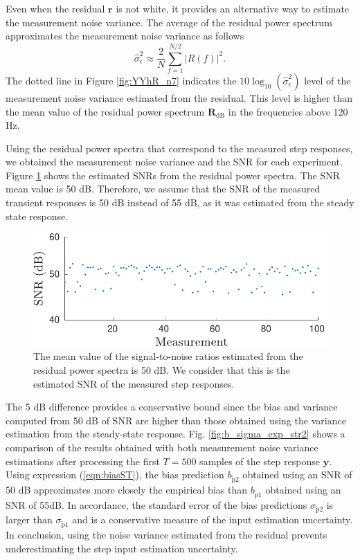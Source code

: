 Even when the residual $\mathbf{r}$ is not white, it provides an alternative way to estimate the measurement noise variance. 
The average of the residual power spectrum approximates the measurement noise variance as follows
\begin{equation} \widehat{\sigma}_\epsilon^2 \approx \dfrac{2}{N} \sum_{f = 1}^{N/2} \left| R \left( f \right) \right|^2 . \label{eqn:P_R} \end{equation}
The dotted line in Figure \ref{fig:YYhR_n7} indicates the $10 \log_{10} \left( \widehat{\sigma}_\epsilon^2 \right)$ level of the measurement noise variance estimated from the residual.
This level is higher than the mean value of the residual power spectrum $\mathbf{R}_\mathrm{dB}$ in the frequencies above 120 Hz.

Using the residual power spectra that correspond to the measured step responses, we obtained the measurement noise variance and the SNR for each experiment.
Figure \ref{fig:meas_SNR} shows the estimated SNRs from the residual power spectra. 
The SNR mean value is 50 dB.
Therefore, we assume that the SNR of the measured transient responses is 50 dB instead of 55 dB, as it was estimated from the steady state response.

\begin{figure}[!htb]
\centering
\includegraphics[width=1.0\columnwidth]{./ChapterExperimentalValidation/fig/Fig_10.pdf}
\caption{ \label{fig:meas_SNR} 
The mean value of the signal-to-noise ratios estimated from the residual power spectra is 50 dB.
We consider that this is the estimated SNR of the measured step responses.}
\end{figure}

The 5 dB difference provides a conservative bound since the bias and variance computed from 50 dB of SNR are higher than those obtained using the variance estimation from the steady-state response. 
Fig. \ref{fig:b_sigma_exp_str2} shows a comparison of the results obtained with both measurement noise variance estimations after processing the first $T=500$ samples of the step response $\mathbf{y}$.
Using expression (\ref{eqn:biasST}), the bias prediction  $b_{\widetilde{\mathrm{p}}2}$ obtained using an SNR of 50 dB approximates more closely the empirical bias than $b_{\widetilde{\mathrm{p}}1}$ obtained using an SNR of 55dB.
In accordance, the standard error of the bias predictions $\sigma_{\widetilde{\mathrm{p}}2}$ is larger than $\sigma_{\widetilde{\mathrm{p}}1}$ and is a conservative measure of the input estimation uncertainty.
In conclusion, using the noise variance estimated from the residual prevents underestimating the step input estimation uncertainty.


